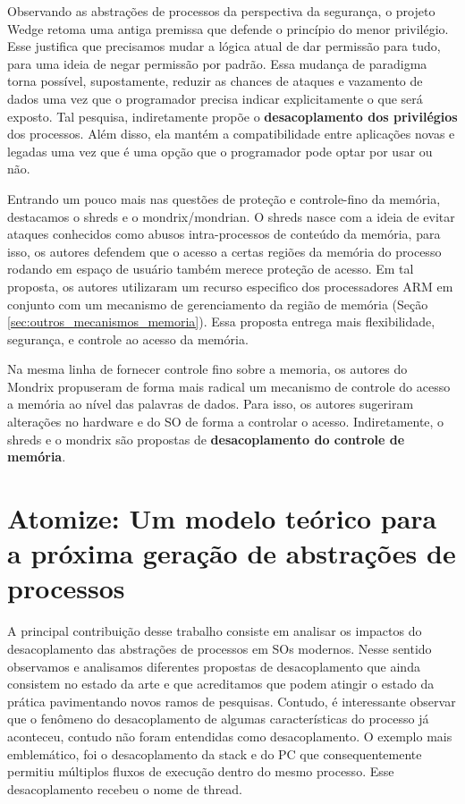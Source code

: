 Observando as abstrações de processos da perspectiva da segurança, o projeto
Wedge retoma uma antiga premissa que defende o princípio do menor privilégio.
Esse justifica que precisamos mudar a lógica atual de dar permissão para tudo,
para uma ideia de negar permissão por padrão. Essa mudança de paradigma torna
possível, supostamente, reduzir as chances de ataques e vazamento de dados uma
vez que o programador precisa indicar explicitamente o que será exposto. Tal
pesquisa, indiretamente propõe o \textbf{desacoplamento dos privilégios} dos
processos. Além disso, ela mantém a compatibilidade entre aplicações novas e
legadas uma vez que é uma opção que o programador pode optar por usar ou não.

Entrando um pouco mais nas questões de proteção e controle-fino da memória,
destacamos o shreds e o mondrix/mondrian. O shreds nasce com a ideia de evitar
ataques conhecidos como abusos intra-processos de conteúdo da memória, para
isso, os autores defendem que o acesso a certas regiões da memória do processo
rodando em espaço de usuário também merece proteção de acesso. Em tal proposta,
os autores utilizaram um recurso especifico dos processadores ARM em conjunto
com um mecanismo de gerenciamento da região de memória (Seção
\ref{sec:outros_mecanismos_memoria}). Essa proposta entrega mais flexibilidade,
segurança, e controle ao acesso da memória.

Na mesma linha de fornecer controle fino sobre a memoria, os autores do Mondrix
propuseram de forma mais radical um mecanismo de controle do acesso a memória
ao nível das palavras de dados. Para isso, os autores sugeriram alterações no
hardware e do SO de forma a controlar o acesso. Indiretamente, o shreds e o
mondrix são propostas de \textbf{desacoplamento do controle de memória}.

\section{Atomize: Um modelo teórico para a próxima geração de abstrações de processos}

A principal contribuição desse trabalho consiste em analisar os impactos do
desacoplamento das abstrações de processos em SOs modernos. Nesse sentido
observamos e analisamos diferentes propostas de desacoplamento que ainda
consistem no estado da arte e que acreditamos que podem atingir o estado da
prática pavimentando novos ramos de pesquisas.  Contudo, é interessante
observar que o fenômeno do desacoplamento de algumas características do
processo já aconteceu, contudo não foram entendidas como desacoplamento. O
exemplo mais emblemático, foi o desacoplamento da stack e do PC que
consequentemente permitiu múltiplos fluxos de execução dentro do mesmo
processo. Esse desacoplamento recebeu o nome de thread.


